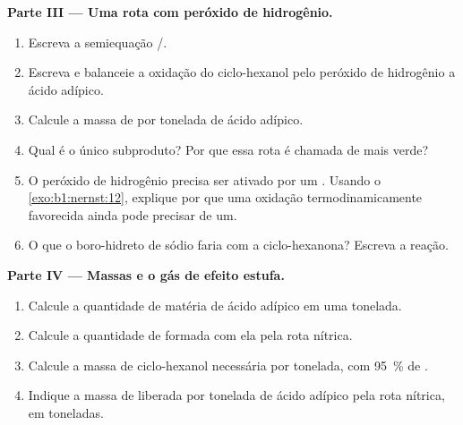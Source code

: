 \begin{problem}
\medskip
\noindent\textbf{Parte III --- Uma rota com peróxido de hidrogênio.}
\begin{enumerate}[resume]
  \item Escreva a semiequação /.
  \item Escreva e balanceie a oxidação do ciclo-hexanol pelo peróxido de
        hidrogênio a ácido adípico.
  \item Calcule a massa de  por tonelada de ácido adípico.
  \item Qual é o único subproduto? Por que essa rota é chamada de mais verde?
  \item O peróxido de hidrogênio precisa ser ativado por um .
        Usando o \cref{exo:b1:nernst:12}, explique por que uma oxidação
        termodinamicamente favorecida ainda pode precisar de um.
  \item O que o boro-hidreto de sódio faria com a ciclo-hexanona? Escreva a
        reação.
\end{enumerate}

\medskip
\noindent\textbf{Parte IV --- Massas e o gás de efeito estufa.}
\begin{enumerate}[resume]
  \item Calcule a quantidade de matéria de ácido adípico em uma tonelada.
  \item Calcule a quantidade de  formada com ela pela rota nítrica.
  \item Calcule a massa de ciclo-hexanol necessária por tonelada, com
        \qty{95}{\percent} de .
  \item Indique a massa de  liberada por tonelada de ácido adípico
        pela rota nítrica, em toneladas.
\end{enumerate}
\end{problem}
